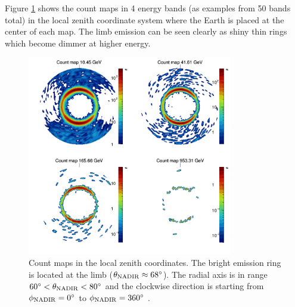 

Figure \ref{fig:cntmap_polar} shows the count maps in 4 energy bands
(as examples from 50 bands total) in the local zenith coordinate
system where the Earth is placed at the center of each map.
The limb emission can be seen clearly as shiny thin rings
which become dimmer at higher energy.


\begin{figure}[h!]
    \centering
    \includegraphics[width=0.8\textwidth]{content/result_and_discussion/figures/zoom_rs/polar_cntmaps.png}
    \caption{
        Count maps in the local zenith coordinates.
        The bright emission ring
        is located at the limb ($\theta_{\rm NADIR}\approx68^\circ$).
        The radial axis is in range $60^\circ<\theta_{\rm NADIR}<80^\circ$
        and the clockwise direction is starting from $\phi_{\rm NADIR}=0^\circ$ 
        to $\phi_{\rm NADIR}=360^\circ$ .
    }
    \label{fig:cntmap_polar}
\end{figure}


